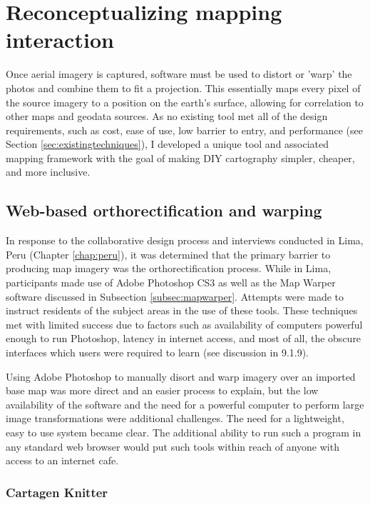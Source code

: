 \documentclass[11pt,oneside,notitlepage]{report}
\begin{document}
\section{Reconceptualizing mapping interaction}

Once aerial imagery is captured, software must be used to distort or 'warp' the photos and combine them to fit a projection. This essentially maps every pixel of the source imagery to a position on the earth's surface, allowing for correlation to other maps and geodata sources. As no existing tool met all of the design requirements, such as cost, ease of use, low barrier to entry, and performance (see Section \ref{sec:existingtechniques}), I developed a unique tool and associated mapping framework with the goal of making DIY cartography simpler, cheaper, and more inclusive.

\subsection{Web-based orthorectification and warping}

In response to the collaborative design process and interviews conducted in Lima, Peru (Chapter \ref{chap:peru}), it was determined that the primary barrier to producing map imagery was the orthorectification process. While in Lima, participants made use of Adobe Photoshop CS3 as well as the Map Warper software discussed in Subsection \ref{subsec:mapwarper}. Attempts were made to instruct residents of the subject areas in the use of these tools. These techniques met with limited success due to factors such as availability of computers powerful enough to run Photoshop, latency in internet access, and most of all, the obscure interfaces which users were required to learn (see discussion in 9.1.9).  

Using Adobe Photoshop to manually disort and warp imagery over an imported base map was more direct and an easier process to explain, but the low availability of the software and the need for a powerful computer to perform large image transformations were additional challenges. The need for a lightweight, easy to use system became clear. The additional ability to run such a program in any standard web browser would put such tools within reach of anyone with access to an internet cafe.

\subsubsection{Cartagen Knitter}
\label{subsubsec:knitter}
\end{document}
